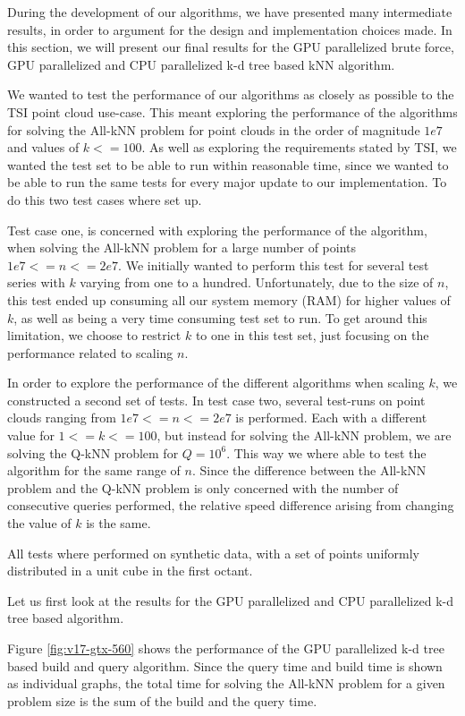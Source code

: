 During the development of our algorithms, we have presented many intermediate results, in order to argument for the design and implementation choices made. In this section, we will present our final results for the GPU parallelized brute force, GPU parallelized and CPU parallelized k-d tree based kNN algorithm.

We wanted to test the performance of our algorithms as closely as possible to the TSI point cloud use-case. This meant exploring the performance of the algorithms for solving the All-kNN problem for point clouds in the order of magnitude $1e7$ and values of $k<=100$. As well as exploring the requirements stated by TSI, we wanted the test set to be able to run within reasonable time, since we wanted to be able to run the same tests for every major update to our implementation. To do this two test cases where set up.

Test case one, is concerned with exploring the performance of the algorithm, when solving the All-kNN problem for a large number of points $1e7<=n<=2e7$. We initially wanted to perform this test for several test series with $k$ varying from one to a hundred. Unfortunately, due to the size of $n$, this test ended up consuming all our system memory (RAM) for higher values of $k$, as well as being a very time consuming test set to run. To get around this limitation, we choose to restrict $k$ to one in this test set, just focusing on the performance related to scaling $n$.

In order to explore the performance of the different algorithms when scaling $k$, we constructed a second set of tests. In test case two, several test-runs on point clouds ranging from $1e7<=n<=2e7$ is performed. Each with a different value for $1<=k<=100$, but instead for solving the All-kNN problem, we are solving the Q-kNN problem for $Q=10^6$. This way we where able to test the algorithm for the same range of $n$. Since the difference between the All-kNN problem and the Q-kNN problem is only concerned with the number of consecutive queries performed, the relative speed difference arising from changing the value of $k$ is the same.

All tests where performed on synthetic data, with a set of points uniformly distributed in a unit cube in the first octant.

Let us first look at the results for the GPU parallelized and CPU parallelized k-d tree based algorithm.

Figure \ref{fig:v17-gtx-560} shows the performance of the GPU parallelized k-d tree based build and query algorithm. Since the query time and build time is shown as individual graphs, the total time for solving the All-kNN problem for a given problem size is the sum of the build and the query time.

